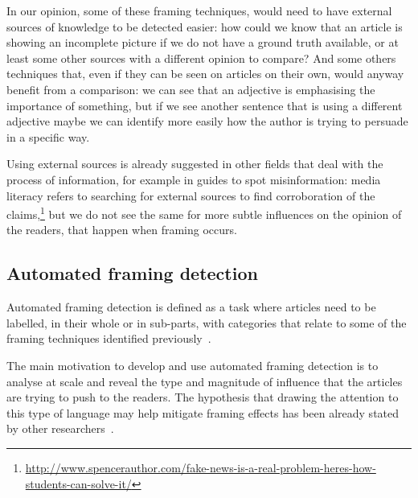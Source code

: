 In our opinion, some of these framing techniques, would need to have external sources of knowledge to be detected easier: how could we know that an article is showing an incomplete picture if we do not have a ground truth available, or at least some other sources with a different opinion to compare?
And some others techniques that, even if they can be seen on articles on their own, would anyway benefit from a comparison: we can see that an adjective is emphasising the importance of something, but if we see another sentence that is using a different adjective maybe we can identify more easily how the author is trying to persuade in a specific way.

Using external sources is already suggested in other fields that deal with the process of information, for example in guides to spot misinformation: media literacy refers to searching for external sources to find corroboration of the claims,\footnote{\url{http://www.spencerauthor.com/fake-news-is-a-real-problem-heres-how-students-can-solve-it/}} but we do not see the same for more subtle influences on the opinion of the readers, that happen when framing occurs.


\subsection{Automated framing detection}
\label{ssec:lit_framing_auto}

Automated framing detection is defined as a task where articles need to be labelled, in their whole or in sub-parts, with categories that relate to some of the framing techniques identified previously~\cite{morstatter2018identifying,liu2019detecting}.

The main motivation to develop and use automated framing detection is to analyse at scale and reveal the type and magnitude of influence that the articles are trying to push to the readers. The hypothesis that drawing the attention to this type of language may help mitigate framing effects has been already stated by other researchers~\cite{baumer2015testing}.


